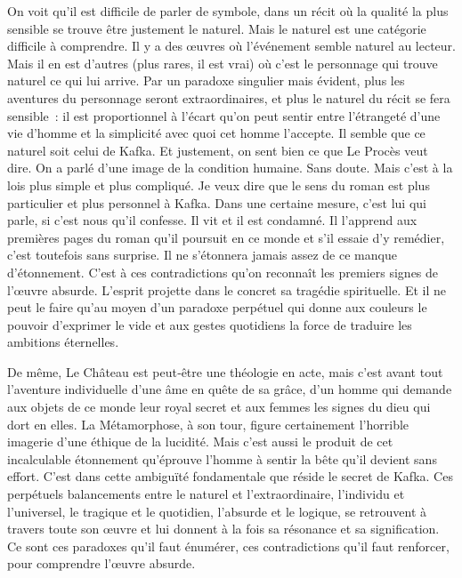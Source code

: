 \documentclass{book}
\begin{document}
On voit qu'il est difficile de parler de symbole, dans un récit où la qualité la plus sensible se trouve être justement le naturel. Mais le naturel est une catégorie difficile à comprendre. Il y a des œuvres où l'événement semble naturel au lecteur. Mais il en est d'autres (plus rares, il est vrai) où c'est le personnage qui trouve naturel ce qui lui arrive. Par un paradoxe singulier mais évident, plus les aventures du personnage seront extraordinaires, et plus le naturel du récit se fera sensible : il est proportionnel à l'écart qu'on peut sentir entre l'étrangeté d'une vie d'homme et la simplicité avec quoi cet homme l'accepte. Il semble que ce naturel soit celui de Kafka. Et justement, on sent bien ce que Le Procès veut dire. On a parlé d'une image de la condition humaine. Sans doute. Mais c'est à la lois plus simple et plus compliqué. Je veux dire que le sens du roman est plus particulier et plus personnel à Kafka. Dans une certaine mesure, c'est lui qui parle, si c'est nous qu'il confesse. Il vit et il est condamné. Il l'apprend aux premières pages du roman qu'il poursuit en ce monde et s'il essaie d'y remédier, c'est toutefois sans surprise. Il ne s'étonnera jamais assez de ce manque d'étonnement. C'est à ces contradictions qu'on reconnaît les premiers signes de l'œuvre absurde. L'esprit projette dans le concret sa tragédie spirituelle. Et il ne peut le faire qu'au moyen d'un paradoxe perpétuel qui donne aux couleurs le pouvoir d'exprimer le vide et aux gestes quotidiens la force de traduire les ambitions éternelles.

De même, Le Château est peut‑être une théologie en acte, mais c'est avant tout l'aventure individuelle d'une âme en quête de sa grâce, d'un homme qui demande aux objets de ce monde leur royal secret et aux femmes les signes du dieu qui dort en elles. La Métamorphose, à son tour, figure certainement l'horrible imagerie d'une éthique de la lucidité. Mais c'est aussi le produit de cet incalculable étonnement qu'éprouve l'homme à sentir la bête qu'il devient sans effort. C'est dans cette ambiguïté fondamentale que réside le secret de Kafka. Ces perpétuels balancements entre le naturel et l'extraordinaire, l'individu et l'universel, le tragique et le quotidien, l'absurde et le logique, se retrouvent à travers toute son œuvre et lui donnent à la fois sa résonance et sa signification. Ce sont ces paradoxes qu'il faut énumérer, ces contradictions qu'il faut renforcer, pour comprendre l'œuvre absurde.
\end{document}
